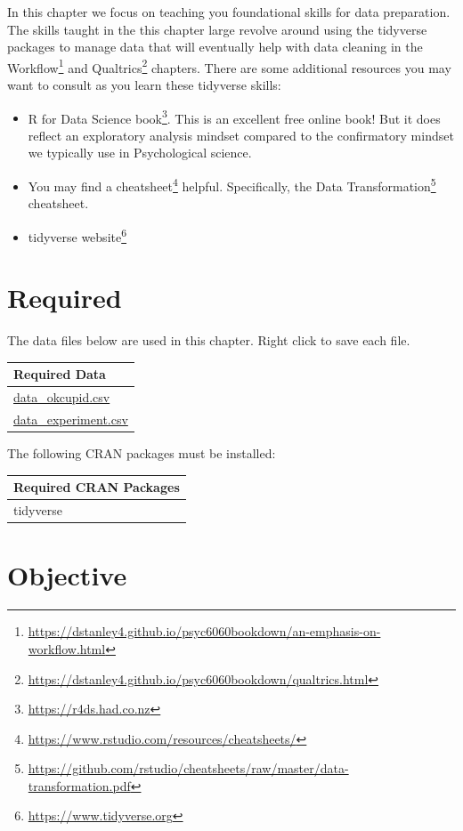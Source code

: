 \documentclass[
]{krantz}
\renewcommand{\href}[2]{#2\footnote{\url{#1}}}
\begin{document}
In this chapter we focus on teaching you foundational skills for data preparation. The skills taught in the this chapter large revolve around using the tidyverse packages to manage data that will eventually help with data cleaning in the \href{https://dstanley4.github.io/psyc6060bookdown/an-emphasis-on-workflow.html}{Workflow} and \href{https://dstanley4.github.io/psyc6060bookdown/qualtrics.html}{Qualtrics} chapters. There are some additional resources you may want to consult as you learn these tidyverse skills:

\begin{itemize}
\item
  \href{https://r4ds.had.co.nz}{R for Data Science book}. This is an excellent free online book! But it does reflect an exploratory analysis mindset compared to the confirmatory mindset we typically use in Psychological science.
\item
  You may find a \href{https://www.rstudio.com/resources/cheatsheets/}{cheatsheet} helpful. Specifically, the \href{https://github.com/rstudio/cheatsheets/raw/master/data-transformation.pdf}{Data Transformation} cheatsheet.
\item
  \href{https://www.tidyverse.org}{tidyverse website}
\end{itemize}

\hypertarget{required}{%
\section{Required}\label{required}}

The data files below are used in this chapter. Right click to save each file.

\begin{longtable}[]{@{}l@{}}
\toprule
Required Data \\
\midrule
\endhead
\url{data_okcupid.csv} \\
\url{data_experiment.csv} \\
\bottomrule
\end{longtable}

The following CRAN packages must be installed:

\begin{longtable}[]{@{}l@{}}
\toprule
Required CRAN Packages \\
\midrule
\endhead
tidyverse \\
\bottomrule
\end{longtable}

\hypertarget{objective}{%
\section{Objective}\label{objective}}
\end{document}
